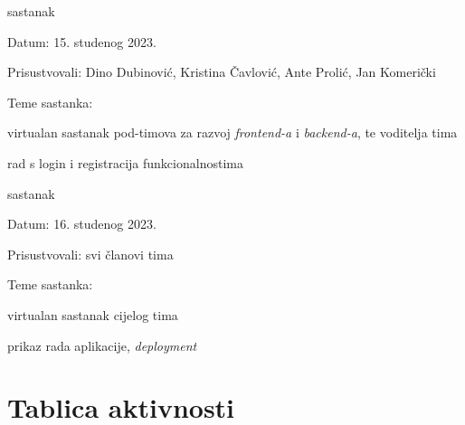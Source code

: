 \begin{packed_enum}
			\item  sastanak
			\item[] \begin{packed_item}
				\item Datum: 15. studenog 2023.
				\item Prisustvovali: Dino Dubinović, Kristina Čavlović, Ante Prolić, Jan Komerički
				\item Teme sastanka:
				\begin{packed_item}
					\item  virtualan sastanak pod-timova za razvoj \textit{frontend-a} i \textit{backend-a}, te voditelja tima
					\item  rad s login i registracija funkcionalnostima
				\end{packed_item}
			\end{packed_item}
			
			\item  sastanak
			\item[] \begin{packed_item}
				\item Datum: 16. studenog 2023.
				\item Prisustvovali: svi članovi tima
				\item Teme sastanka:
				\begin{packed_item}
					\item  virtualan sastanak cijelog tima
					\item  prikaz rada aplikacije, \textit{deployment}
				\end{packed_item}
			\end{packed_item}
			
		\end{packed_enum}
		
		\eject
		\section*{Tablica aktivnosti}
		

